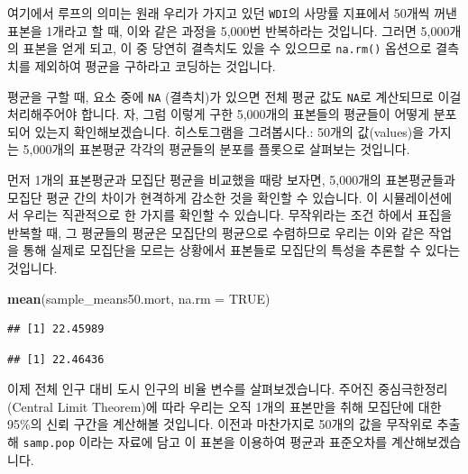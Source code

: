 \documentclass[]{book}
\newenvironment{Shaded}{\begin{snugshade}}{\end{snugshade}}
\newcommand{\DataTypeTok}[1]{\textcolor[rgb]{0.13,0.29,0.53}{#1}}
\newcommand{\KeywordTok}[1]{\textcolor[rgb]{0.13,0.29,0.53}{\textbf{#1}}}
\newcommand{\NormalTok}[1]{#1}
\newcommand{\OperatorTok}[1]{\textcolor[rgb]{0.81,0.36,0.00}{\textbf{#1}}}
\newcommand{\OtherTok}[1]{\textcolor[rgb]{0.56,0.35,0.01}{#1}}
\begin{document}
여기에서 루프의 의미는 원래 우리가 가지고 있던 \texttt{WDI}의 사망률 지표에서 50개씩 꺼낸 표본을 1개라고 할 때, 이와 같은 과정을 5,000번 반복하라는 것입니다. 그러면 5,000개의 표본을 얻게 되고, 이 중 당연히 결측치도 있을 수 있으므로 \texttt{na.rm()} 옵션으로 결측치를 제외하여 평균을 구하라고 코딩하는 것입니다.

평균을 구할 때, 요소 중에 \texttt{NA} (결측치)가 있으면 전체 평균 값도 \texttt{NA}로 계산되므로 이걸 처리해주어야 합니다. 자, 그럼 이렇게 구한 5,000개의 표본들의 평균들이 어떻게 분포되어 있는지 확인해보겠습니다. 히스토그램을 그려봅시다.: 50개의 값(values)을 가지는 5,000개의 표본평균 각각의 평균들의 분포를 플롯으로 살펴보는 것입니다.

먼저 1개의 표본평균과 모집단 평균을 비교했을 때랑 보자면, 5,000개의 표본평균들과 모집단 평균 간의 차이가 현격하게 감소한 것을 확인할 수 있습니다. 이 시뮬레이션에서 우리는 직관적으로 한 가지를 확인할 수 있습니다. 무작위라는 조건 하에서 표집을 반복할 때, 그 평균들의 평균은 모집단의 평균으로 수렴하므로 우리는 이와 같은 작업을 통해 실제로 모집단을 모르는 상황에서 표본들로 모집단의 특성을 추론할 수 있다는 것입니다.

\begin{Shaded}
\begin{Highlighting}[]
\KeywordTok{mean}\NormalTok{(sample_means50.mort, }\DataTypeTok{na.rm =} \OtherTok{TRUE}\NormalTok{)}
\end{Highlighting}
\end{Shaded}

\begin{verbatim}
## [1] 22.45989
\end{verbatim}

\begin{Shaded}
\end{Shaded}

\begin{verbatim}
## [1] 22.46436
\end{verbatim}

이제 전체 인구 대비 도시 인구의 비율 변수를 살펴보겠습니다. 주어진 중심극한정리 (Central Limit Theorem)에 따라 우리는 오직 1개의 표본만을 취해 모집단에 대한 95\%의 신뢰 구간을 계산해볼 것입니다. 이전과 마찬가지로 50개의 값을 무작위로 추출해 \texttt{samp.pop} 이라는 자료에 담고 이 표본을 이용하여 평균과 표준오차를 계산해보겠습니다.
\end{document}
